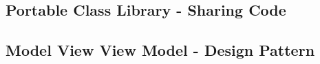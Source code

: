\subsection{Portable Class Library - Sharing Code}
\label{sec:xamarinformscodesharing}


\subsection{Model View View Model - Design Pattern}
\label{sec:xamarinformsmvvm}

